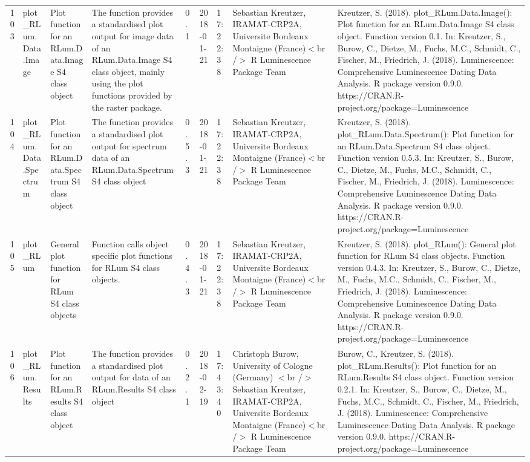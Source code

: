 \begin{table}[ht]
\begin{tabular}{rllllllll}
 \\ 
  103 & plot\_RLum.Data.Image & Plot function for an  RLum.Data.Image  S4 class object & The function provides a standardised plot output for image data of an RLum.Data.Image S4 class object, mainly using the plot functions provided by the  raster  package. & 0.1 & 2018-01-21 & 17:22:38
 & Sebastian Kreutzer, IRAMAT-CRP2A, Universite Bordeaux Montaigne (France)$<$br /$>$  R Luminescence Package Team & Kreutzer, S. (2018). plot\_RLum.Data.Image(): Plot function for an RLum.Data.Image S4 class object. Function version 0.1. In: Kreutzer, S., Burow, C., Dietze, M., Fuchs, M.C., Schmidt, C., Fischer, M., Friedrich, J. (2018). Luminescence: Comprehensive Luminescence Dating Data Analysis. R package version 0.9.0. https://CRAN.R-project.org/package=Luminescence
 \\ 
  104 & plot\_RLum.Data.Spectrum & Plot function for an RLum.Data.Spectrum S4 class object & The function provides a standardised plot output for spectrum data of an RLum.Data.Spectrum S4 class object & 0.5.3 & 2018-01-21 & 17:22:38
 & Sebastian Kreutzer, IRAMAT-CRP2A, Universite Bordeaux Montaigne (France)$<$br /$>$  R Luminescence Package Team & Kreutzer, S. (2018). plot\_RLum.Data.Spectrum(): Plot function for an RLum.Data.Spectrum S4 class object. Function version 0.5.3. In: Kreutzer, S., Burow, C., Dietze, M., Fuchs, M.C., Schmidt, C., Fischer, M., Friedrich, J. (2018). Luminescence: Comprehensive Luminescence Dating Data Analysis. R package version 0.9.0. https://CRAN.R-project.org/package=Luminescence
 \\ 
  105 & plot\_RLum & General plot function for RLum S4 class objects & Function calls object specific plot functions for RLum S4 class objects. & 0.4.3 & 2018-01-21 & 17:22:38
 & Sebastian Kreutzer, IRAMAT-CRP2A, Universite Bordeaux Montaigne (France)$<$br /$>$  R Luminescence Package Team & Kreutzer, S. (2018). plot\_RLum(): General plot function for RLum S4 class objects. Function version 0.4.3. In: Kreutzer, S., Burow, C., Dietze, M., Fuchs, M.C., Schmidt, C., Fischer, M., Friedrich, J. (2018). Luminescence: Comprehensive Luminescence Dating Data Analysis. R package version 0.9.0. https://CRAN.R-project.org/package=Luminescence
 \\ 
  106 & plot\_RLum.Results & Plot function for an RLum.Results S4 class object & The function provides a standardised plot output for data of an RLum.Results S4 class object & 0.2.1 & 2018-02-19 & 17:43:40
 & Christoph Burow, University of Cologne (Germany)  $<$br /$>$ Sebastian Kreutzer, IRAMAT-CRP2A, Universite Bordeaux Montaigne (France)$<$br /$>$  R Luminescence Package Team & Burow, C., Kreutzer, S. (2018). plot\_RLum.Results(): Plot function for an RLum.Results S4 class object. Function version 0.2.1. In: Kreutzer, S., Burow, C., Dietze, M., Fuchs, M.C., Schmidt, C., Fischer, M., Friedrich, J. (2018). Luminescence: Comprehensive Luminescence Dating Data Analysis. R package version 0.9.0. https://CRAN.R-project.org/package=Luminescence

\end{tabular}
\end{table}

